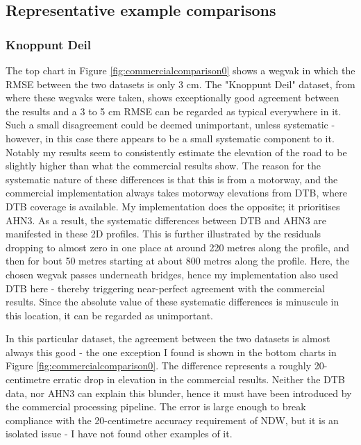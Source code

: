 \subsection{Representative example comparisons}
\label{sub:comparisonexamples}

\subsubsection{Knoppunt Deil}

The top chart in Figure \ref{fig:commercialcomparison0} shows a wegvak in which the RMSE between the two datasets is only 3 cm. The "Knoppunt Deil" dataset, from where these wegvaks were taken, shows exceptionally good agreement between the results and a 3 to 5 cm RMSE can be regarded as typical everywhere in it. Such a small disagreement could be deemed unimportant, unless systematic - however, in this case there appears to be a small systematic component to it. Notably my results seem to consistently estimate the elevation of the road to be slightly higher than what the commercial results show. The reason for the systematic nature of these differences is that this is from a motorway, and the commercial implementation always takes motorway elevations from DTB, where DTB coverage is available. My implementation does the opposite; it prioritises AHN3. As a result, the systematic differences between DTB and AHN3 are manifested in these 2D profiles. This is further illustrated by the residuals dropping to almost zero in one place at around 220 metres along the profile, and then for bout 50 metres starting at about 800 metres along the profile. Here, the chosen wegvak passes underneath bridges, hence my implementation also used DTB here - thereby triggering near-perfect agreement with the commercial results. Since the absolute value of these systematic differences is minuscule in this location, it can be regarded as unimportant.

In this particular dataset, the agreement between the two datasets is almost always this good - the one exception I found is shown in the bottom charts in Figure \ref{fig:commercialcomparison0}. The difference represents a roughly 20-centimetre erratic drop in elevation in the commercial results. Neither the DTB data, nor AHN3 can explain this blunder, hence it must have been introduced by the commercial processing pipeline. The error is large enough to break compliance with the 20-centimetre accuracy requirement of NDW, but it is an isolated issue - I have not found other examples of it.

